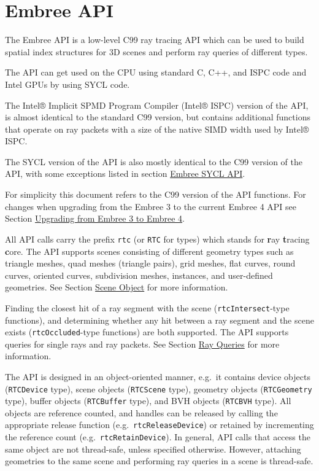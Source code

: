 \pagebreak

\chapter{Embree API}\label{embree-api}

The Embree API is a low-level C99 ray tracing API which can be used to
build spatial index structures for 3D scenes and perform ray queries of
different types.

The API can get used on the CPU using standard C, C++, and ISPC code and
Intel GPUs by using SYCL code.

The Intel® Implicit SPMD Program Compiler (Intel® ISPC) version of the
API, is almost identical to the standard C99 version, but contains
additional functions that operate on ray packets with a size of the
native SIMD width used by Intel® ISPC.

The SYCL version of the API is also mostly identical to the C99 version
of the API, with some exceptions listed in section
\hyperref[embree-sycl-api]{Embree SYCL API}.

For simplicity this document refers to the C99 version of the API
functions. For changes when upgrading from the Embree 3 to the current
Embree 4 API see Section
\hyperref[upgrading-from-embree-3-to-embree-4]{Upgrading from Embree 3
to Embree 4}.

All API calls carry the prefix \texttt{rtc} (or \texttt{RTC} for types)
which stands for \textbf{r}ay \textbf{t}racing \textbf{c}ore. The API
supports scenes consisting of different geometry types such as triangle
meshes, quad meshes (triangle pairs), grid meshes, flat curves, round
curves, oriented curves, subdivision meshes, instances, and user-defined
geometries. See Section \hyperref[scene-object]{Scene Object} for more
information.

Finding the closest hit of a ray segment with the scene
(\texttt{rtcIntersect}-type functions), and determining whether any hit
between a ray segment and the scene exists (\texttt{rtcOccluded}-type
functions) are both supported. The API supports queries for single rays
and ray packets. See Section \hyperref[ray-queries]{Ray Queries} for
more information.

The API is designed in an object-oriented manner, e.g.~it contains
device objects (\texttt{RTCDevice} type), scene objects
(\texttt{RTCScene} type), geometry objects (\texttt{RTCGeometry} type),
buffer objects (\texttt{RTCBuffer} type), and BVH objects
(\texttt{RTCBVH} type). All objects are reference counted, and handles
can be released by calling the appropriate release function
(e.g.~\texttt{rtcReleaseDevice}) or retained by incrementing the
reference count (e.g.~\texttt{rtcRetainDevice}). In general, API calls
that access the same object are not thread-safe, unless specified
otherwise. However, attaching geometries to the same scene and
performing ray queries in a scene is thread-safe.

